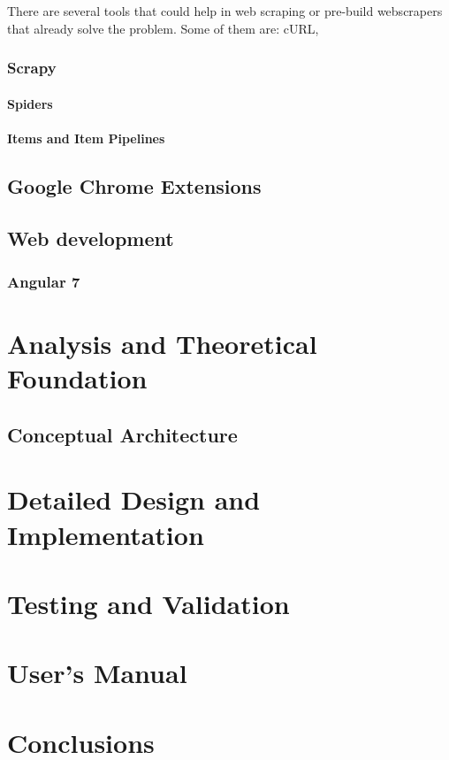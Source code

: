 \documentclass[12pt,a4paper,twoside]{report}
\begin{document}
There are several tools that could help in web scraping or pre-build webscrapers that already solve the problem. Some of them are: cURL, 

\subsection{Scrapy}
\subsubsection{Spiders}
\subsubsection{Items and Item Pipelines}


\section{Google Chrome Extensions}

\section{Web development}
\subsection{Angular 7}



\chapter{Analysis and Theoretical Foundation}

\section{Conceptual Architecture}


\chapter{Detailed Design and Implementation}



\chapter{Testing and Validation}



\chapter{User's Manual}



\chapter{Conclusions}






\end{document}
